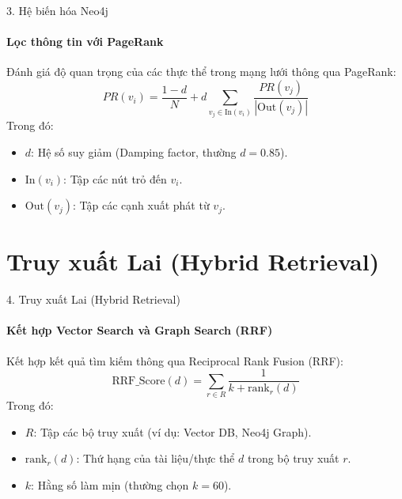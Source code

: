 \documentclass[aspectratio=169,xcolor=table]{beamer}
\begin{document}
\begin{frame}{3. Hệ biến hóa Neo4j}
    \framesubtitle{Lọc thông tin với PageRank}
    Đánh giá độ quan trọng của các thực thể trong mạng lưới thông qua PageRank:
    \begin{equation}
        PR(v_i) = \frac{1 - d}{N} + d \sum_{v_j \in \text{In}(v_i)} \frac{PR(v_j)}{|\text{Out}(v_j)|}
    \end{equation}
    Trong đó:
    \begin{itemize}
        \item $d$: Hệ số suy giảm (Damping factor, thường $d=0.85$).
        \item $\text{In}(v_i)$: Tập các nút trỏ đến $v_i$.
        \item $\text{Out}(v_j)$: Tập các cạnh xuất phát từ $v_j$.
    \end{itemize}
\end{frame}

\section{Truy xuất Lai (Hybrid Retrieval)}

\begin{frame}{4. Truy xuất Lai (Hybrid Retrieval)}
    \framesubtitle{Kết hợp Vector Search và Graph Search (RRF)}
    Kết hợp kết quả tìm kiếm thông qua Reciprocal Rank Fusion (RRF):
    \begin{equation}
        \text{RRF\_Score}(d) = \sum_{r \in R} \frac{1}{k + \text{rank}_r(d)}
    \end{equation}
    Trong đó:
    \begin{itemize}
        \item $R$: Tập các bộ truy xuất (ví dụ: Vector DB, Neo4j Graph).
        \item $\text{rank}_r(d)$: Thứ hạng của tài liệu/thực thể $d$ trong bộ truy xuất $r$.
        \item $k$: Hằng số làm mịn (thường chọn $k=60$).
    \end{itemize}
\end{frame}
\end{document}
